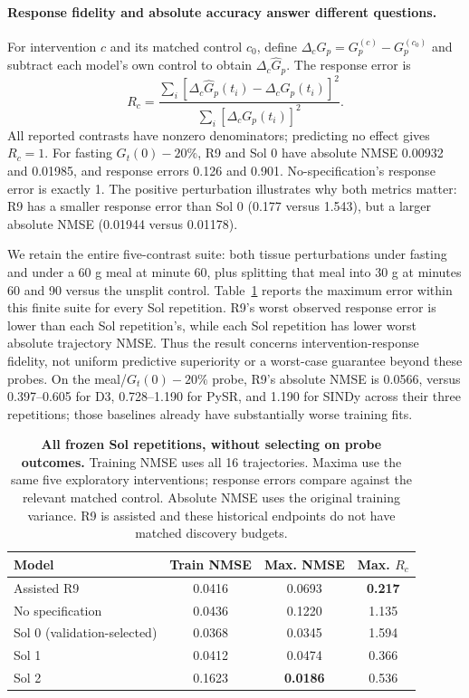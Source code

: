 \paragraph{Response fidelity and absolute accuracy answer different questions.}
For intervention $c$ and its matched control $c_0$, define
$\Delta_c G_p=G_p^{(c)}-G_p^{(c_0)}$ and subtract each model's own control to
obtain $\Delta_c\widehat G_p$. The response error is
\begin{equation}
  R_c=\frac{\sum_i[\Delta_c\widehat G_p(t_i)-\Delta_cG_p(t_i)]^2}
                 {\sum_i[\Delta_cG_p(t_i)]^2}.
  \label{eq:exp_response_error}
\end{equation}
All reported contrasts have nonzero denominators; predicting no effect gives
$R_c=1$. For fasting $G_t(0)-20\%$, R9 and Sol 0 have absolute NMSE
0.00932 and 0.01985, and response errors 0.126 and 0.901. No-specification's
response error is exactly 1. The positive perturbation illustrates why both
metrics matter: R9 has a smaller response error than Sol 0 (0.177 versus
1.543), but a larger absolute NMSE (0.01944 versus 0.01178).

We retain the entire five-contrast suite: both tissue perturbations under
fasting and under a 60 g meal at minute 60, plus splitting that meal into
30 g at minutes 60 and 90 versus the unsplit control. Table~\ref{tab:exp_response_robustness}
reports the maximum error within this finite suite for every Sol repetition.
R9's worst observed response error is lower than each Sol repetition's, while
each Sol repetition has lower worst absolute trajectory NMSE. Thus the result
concerns intervention-response fidelity, not uniform predictive superiority or
a worst-case guarantee beyond these probes. On the meal/$G_t(0)-20\%$ probe,
R9's absolute NMSE is 0.0566, versus 0.397--0.605 for D3,
0.728--1.190 for PySR, and 1.190 for SINDy across their three repetitions;
those baselines already have substantially worse training fits.

\begin{table}[t]
  \centering
  \small
  \setlength{\tabcolsep}{5pt}
  \caption{\textbf{All frozen Sol repetitions, without selecting on probe outcomes.}
  Training NMSE uses all 16 trajectories. Maxima use the same five exploratory
  interventions; response errors compare against the relevant matched control.
  Absolute NMSE uses the original training variance. R9 is assisted and these
  historical endpoints do not have matched discovery budgets.}
  \label{tab:exp_response_robustness}
  \begin{tabular}{lccc}
    \toprule
    Model & Train NMSE & Max. NMSE & Max. $R_c$ \\
    \midrule
    Assisted R9 & 0.0416 & 0.0693 & \textbf{0.217} \\
    No specification & 0.0436 & 0.1220 & 1.135 \\
    Sol 0 (validation-selected) & 0.0368 & 0.0345 & 1.594 \\
    Sol 1 & 0.0412 & 0.0474 & 0.366 \\
    Sol 2 & 0.1623 & \textbf{0.0186} & 0.536 \\
    \bottomrule
  \end{tabular}
\end{table}

